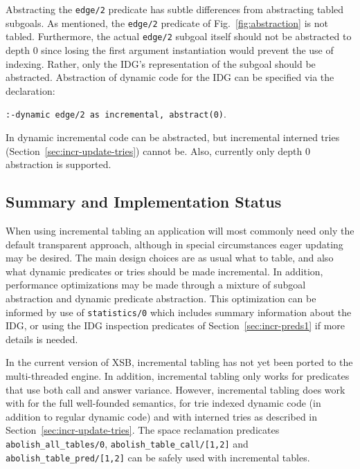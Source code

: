 Abstracting the {\tt edge/2} predicate has subtle differences from
abstracting tabled subgoals.
As mentioned, the {\tt edge/2} predicate of
Fig.~\ref{fig:abstraction} is not tabled.  Furthermore, the actual
{\tt edge/2} subgoal itself should not be abstracted to depth 0 since
losing the first argument instantiation would prevent the use of
indexing.  Rather, only the IDG's representation of the subgoal
should be abstracted.  Abstraction of dynamic code for
the IDG can be specified via the declaration:
\begin{center}
{\tt :-dynamic edge/2 as incremental, abstract(0)}.
\end{center}

In \version{} dynamic incremental code can be abstracted, but
incremental interned tries (Section~\ref{sec:incr-update-tries})
cannot be.  Also, currently only depth 0 abstraction is supported.

\subsection{Summary and Implementation Status}
%
When using incremental tabling an application will most commonly need
only the default transparent approach, although in special
circumstances eager updating may be desired.  The main design choices
are as usual what to table, and also what dynamic predicates or tries
should be made incremental.  In addition, performance optimizations
may be made through a mixture of subgoal abstraction and dynamic
predicate abstraction.  This optimization can be informed by use of
{\tt statistics/0} which includes summary information about the IDG,
or using the IDG inspection predicates of
Section~\ref{sec:incr-preds1} if more details is needed.


In the current version of XSB, incremental tabling has not yet been
ported to the multi-threaded engine.  In addition, incremental tabling
only works for predicates that use both call and answer variance.
However, incremental tabling does work with for the full well-founded
semantics, for trie indexed dynamic code (in addition to regular
dynamic code) and with interned tries as described in
Section~\ref{sec:incr-update-tries}.  The space reclamation predicates
{\tt abolish\_all\_tables/0}, {\tt abolish\_table\_call/[1,2]} and
{\tt abolish\_table\_pred/[1,2]} can be safely used with incremental
tables.

